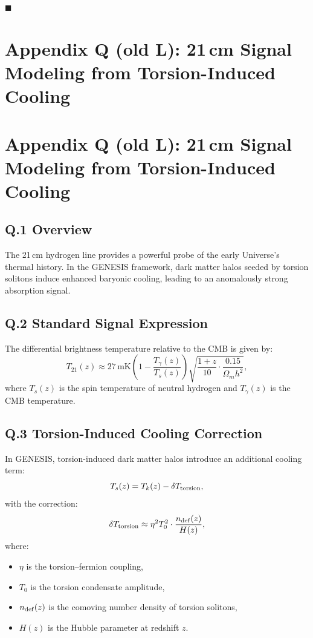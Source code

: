 \documentclass{article}
\begin{document}
\hfill$\blacksquare$




\section*{Appendix Q (old L): 21\,cm Signal Modeling from Torsion-Induced Cooling}
\label{app:21cm}


\section*{Appendix Q (old L): 21\,cm Signal Modeling from Torsion-Induced Cooling}
\label{app:21cm}

\subsection*{Q.1 Overview}
The 21\,cm hydrogen line provides a powerful probe of the early Universe's thermal history. In the GENESIS framework, dark matter halos seeded by torsion solitons induce enhanced baryonic cooling, leading to an anomalously strong absorption signal.

\subsection*{Q.2 Standard Signal Expression}
The differential brightness temperature relative to the CMB is given by:
\begin{equation}
T_{21}(z) \approx 27\,\mathrm{mK} \left(1 - \frac{T_\gamma(z)}{T_s(z)}\right) \sqrt{\frac{1+z}{10} \cdot \frac{0.15}{\Omega_m h^2}},
\end{equation}
where \(T_s(z)\) is the spin temperature of neutral hydrogen and \(T_\gamma(z)\) is the CMB temperature.

\subsection*{Q.3 Torsion-Induced Cooling Correction}
In GENESIS, torsion-induced dark matter halos introduce an additional cooling term:
\begin{equation}
T_s(z) = T_k(z) - \delta T_{\rm torsion},
\end{equation}
with the correction:
\begin{equation}
\delta T_{\rm torsion} \approx \eta^2 T_0^2 \cdot \frac{n_{\rm def}(z)}{H(z)},
\end{equation}
where:
\begin{itemize}
  \item \(\eta\) is the torsion–fermion coupling,
  \item \(T_0\) is the torsion condensate amplitude,
  \item \(n_{\rm def}(z)\) is the comoving number density of torsion solitons,
  \item \(H(z)\) is the Hubble parameter at redshift \(z\).
\end{itemize}
\end{document}

